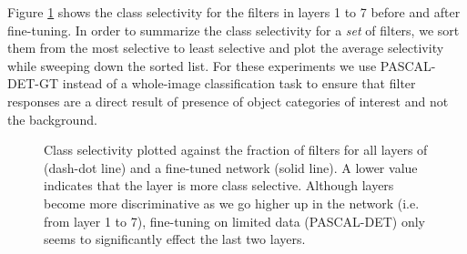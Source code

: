 Figure \ref{fig:fine-entropy} shows the class selectivity for the filters in layers 1 to 7 before and after fine-tuning.
In order to summarize the class selectivity for a \emph{set} of filters, we sort them from the most selective to least selective and plot the average selectivity while sweeping down the sorted list.
For these experiments we use PASCAL-DET-GT instead of a whole-image classification task to ensure that filter responses are a direct result of presence of object categories of interest and not the background.

\begin{figure}[t!]
\centering
{}
\caption{Class selectivity plotted against the fraction of filters for all layers of  (dash-dot line) and a fine-tuned network (solid line). A lower value indicates that the layer is more class selective. Although layers become more discriminative as we go higher up in the network (i.e. from layer 1 to 7), fine-tuning on limited data (PASCAL-DET) only seems to significantly effect the last two layers.}
\label{fig:fine-entropy}
\end{figure}

